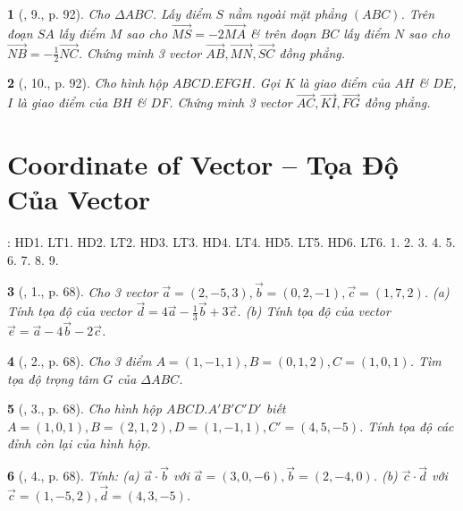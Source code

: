 \documentclass{article}
\newtheorem{baitoan}{}
\begin{document}
\begin{baitoan}[\cite{SGK_Toan_11_hinh_hoc_co_ban}, 9., p. 92]
	Cho $\Delta ABC$. Lấy điểm $S$ nằm ngoài mặt phẳng $(ABC)$. Trên đoạn $SA$ lấy điểm $M$ sao cho $\overrightarrow{MS} = -2\overrightarrow{MA}$ \& trên đoạn $BC$ lấy điểm $N$ sao cho $\overrightarrow{NB} = -\frac{1}{2}\overrightarrow{NC}$. Chứng minh 3 vector $\overrightarrow{AB},\overrightarrow{MN},\overrightarrow{SC}$ đồng phẳng.
\end{baitoan}

\begin{baitoan}[\cite{SGK_Toan_11_hinh_hoc_co_ban}, 10., p. 92]
	Cho hình hộp $ABCD.EFGH$. Gọi $K$ là giao điểm của $AH$ \& $DE$, $I$ là giao điểm của $BH$ \& $DF$. Chứng minh 3 vector $\overrightarrow{AC},\overrightarrow{KI},\overrightarrow{FG}$ đồng phẳng.
\end{baitoan}


\section{Coordinate of Vector -- Tọa Độ Của Vector}
\cite[Chap. II, \S2, pp. 56--73]{SGK_Toan_12_Canh_Dieu_tap_1}: HD1. LT1. HD2. LT2. HD3. LT3. HD4. LT4. HD5. LT5. HD6. LT6. 1. 2. 3. 4. 5. 6. 7. 8. 9.

\begin{baitoan}[\cite{SGK_Toan_12_hinh_hoc_co_ban}, 1., p. 68]
	Cho 3 vector $\vec{a} = (2,-5,3),\vec{b} = (0,2,-1),\vec{c} = (1,7,2)$. (a) Tính tọa độ của vector $\vec{d} = 4\vec{a} - \frac{1}{3}\vec{b} + 3\vec{c}$. (b) Tính tọa độ của vector $\vec{e} = \vec{a} - 4\vec{b} - 2\vec{c}$.
\end{baitoan}

\begin{baitoan}[\cite{SGK_Toan_12_hinh_hoc_co_ban}, 2., p. 68]
	Cho 3 điểm $A = (1,-1,1),B = (0,1,2),C = (1,0,1)$. Tìm tọa độ trọng tâm $G$ của $\Delta ABC$.
\end{baitoan}

\begin{baitoan}[\cite{SGK_Toan_12_hinh_hoc_co_ban}, 3., p. 68]
	Cho hình hộp $ABCD.A'B'C'D'$ biết $A = (1,0,1),B = (2,1,2),D = (1,-1,1),C' = (4,5,-5)$. Tính tọa độ các đỉnh còn lại của hình hộp.
\end{baitoan}

\begin{baitoan}[\cite{SGK_Toan_12_hinh_hoc_co_ban}, 4., p. 68]
	Tính: (a) $\vec{a}\cdot\vec{b}$ với $\vec{a} = (3,0,-6),\vec{b} = (2,-4,0)$. (b) $\vec{c}\cdot\vec{d}$ với $\vec{c} = (1,-5,2),\vec{d} = (4,3,-5)$.
\end{baitoan}
\end{document}
